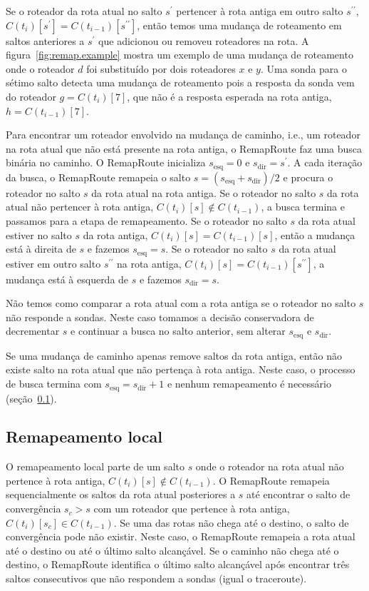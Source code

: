 \documentclass{JBCS}
\newcommand{\rmprt}{{Re\-map\-Rou\-te}}
\newcommand{\figstr}{figura}
\newcommand{\secstr}{seção}
\begin{document}
Se o roteador da rota atual no salto $s^\prime$ pertencer à rota antiga
em outro salto $s^{\prime\prime}$, $C(t_i)[s^\prime] =
C(t_{i-1})[s^{\prime\prime}]$, então temos uma mudança de roteamento em
saltos anteriores a $s^\prime$ que adicionou ou removeu roteadores na
rota.  A \figstr~\ref{fig:remap.example} mostra um exemplo de uma
mudança de roteamento onde o roteador $d$ foi substituído por dois
roteadores $x$ e $y$.  Uma sonda para o sétimo salto detecta uma mudança
de roteamento pois a resposta da sonda vem do roteador $g = C(t_i)[7]$,
que não é a resposta esperada na rota antiga, $h = C(t_{i-1})[7]$.

Para encontrar um roteador envolvido na mudança de caminho, i.e., um
roteador na rota atual que não está presente na rota antiga, o \rmprt{}
faz uma busca binária no caminho.  O \rmprt{} inicializa $s_\mathrm{esq}
= 0$ e $s_\mathrm{dir} = s^\prime$.  A cada iteração da busca, o
\rmprt{} remapeia o salto $s = (s_\mathrm{esq} + s_\mathrm{dir})/2$ e
procura o roteador no salto $s$ da rota atual na rota antiga.  Se o
roteador no salto $s$ da rota atual não pertencer à rota antiga,
$C(t_i)[s] \notin C(t_{i-1})$, a busca termina e passamos para a etapa
de remapeamento.  Se o roteador no salto $s$ da rota atual estiver no
salto $s$ da rota antiga, $C(t_i)[s] = C(t_{i-1})[s]$, então a mudança
está à direita de $s$ e fazemos $s_\mathrm{esq} = s$.  Se o roteador no
salto $s$ da rota atual estiver em outro salto $s^{\prime\prime}$ na
rota antiga, $C(t_i)[s] = C(t_{i-1})[s^{\prime\prime}]$, a mudança está
à esquerda de $s$ e fazemos $s_\mathrm{dir} = s$.

Não temos como comparar a rota atual com a rota antiga se o roteador no
salto $s$ não responde a sondas.  Neste caso tomamos a decisão
conservadora de decrementar $s$ e continuar a busca no salto anterior,
sem alterar $s_\mathrm{esq}$ e $s_\mathrm{dir}$.  

Se uma mudança de caminho apenas remove saltos da rota antiga, então não
existe salto na rota atual que não pertença à rota antiga.  Neste caso,
o processo de busca termina com $s_\mathrm{esq} = s_\mathrm{dir} + 1$ e
nenhum remapeamento é necessário (\secstr~\ref{sec:remap.local}).

\subsection{Remapeamento local}
\label{sec:remap.local}

O remapeamento local parte de um salto $s$ onde o roteador na rota atual
não pertence à rota antiga, $C(t_i)[s] \notin C(t_{i-1})$.  O \rmprt{}
remapeia sequencialmente os saltos da rota atual posteriores a $s$ até
encontrar o salto de convergência $s_c > s$ com um roteador que pertence
à rota antiga, $C(t_i)[s_c] \in C(t_{i-1})$.  Se uma das rotas não chega
até o destino, o salto de convergência pode não existir.  Neste caso, o
\rmprt{} remapeia a rota atual até o destino ou até o último salto
alcançável.  Se o caminho não chega até o destino, o \rmprt{} identifica
o último salto alcançável após encontrar três saltos consecutivos que
não respondem a sondas (igual o traceroute).
\end{document}
